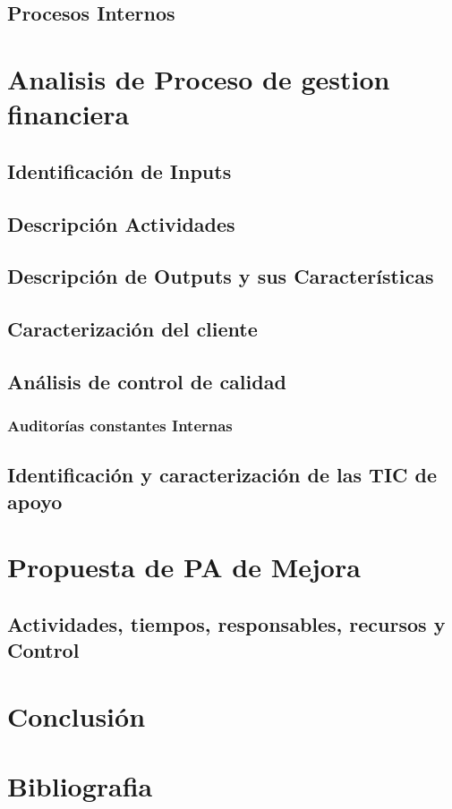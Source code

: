 	\subsection{Procesos Internos}
\section{Analisis de Proceso de gestion financiera}
	\subsection{Identificación de Inputs}
	\subsection{Descripción Actividades}
	\subsection{Descripción de Outputs y sus Características}
	\subsection{Caracterización del cliente}
	\subsection{Análisis de control de calidad}
	\subsubsection{Auditorías constantes Internas}
	\subsection{Identificación y caracterización de las TIC de apoyo}
	
\section{Propuesta de PA de Mejora}
\subsection{Actividades, tiempos, responsables, recursos y Control}
\section{Conclusión}
\section{Bibliografia}

	

